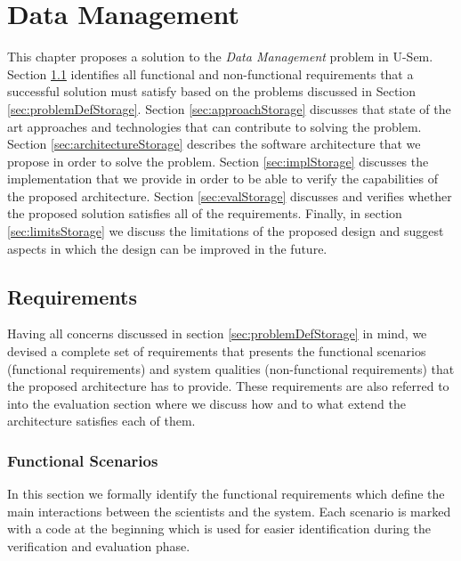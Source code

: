 \chapter{Data Management} 

This chapter proposes a solution to the \textit{Data Management} problem in U-Sem. Section \ref{sec:storageReq} identifies all functional and non-functional requirements that a successful solution must satisfy based on the problems discussed in Section \ref{sec:problemDefStorage}. Section \ref{sec:approachStorage} discusses that state of the art approaches and technologies that  can contribute to solving the problem. Section \ref{sec:architectureStorage} describes the software architecture that we propose in order to solve the problem. Section \ref{sec:implStorage} discusses the implementation that we provide in order to be able to verify the capabilities of the proposed architecture. Section \ref{sec:evalStorage} discusses and verifies whether the proposed solution satisfies all of the requirements. Finally, in section \ref{sec:limitsStorage} we discuss the limitations of the proposed design and suggest aspects in which the design can be improved in the future.

\section{Requirements}
\label{sec:storageReq}

Having all concerns discussed in section \ref{sec:problemDefStorage} in mind, we devised a complete set of requirements that presents the functional scenarios (functional requirements) and system qualities (non-functional requirements) that the proposed architecture has to provide. These requirements are also referred to into the evaluation section where we discuss how and to what extend the architecture satisfies each of them.

\subsection{Functional Scenarios}
In this section we formally identify the functional requirements which define the main interactions between the scientists and the system. Each scenario is marked with a code at the beginning which is used for easier identification during the verification and evaluation phase.

